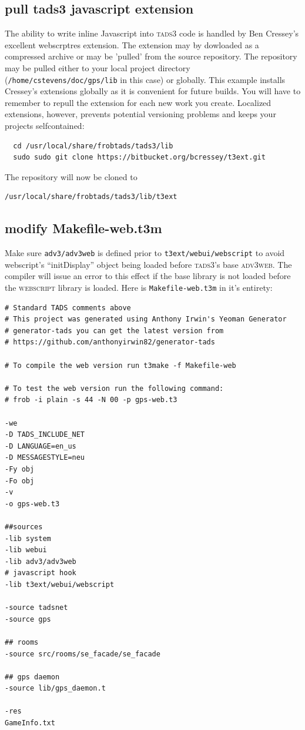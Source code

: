 \subsection{pull tads3 javascript extension}
The ability to write inline Javascript into \textsc{tads3} code is handled by
Ben Cressey's excellent webscrptres
extension. The extension may by dowloaded as a compressed
archive or may be 'pulled' from the source repository. The repository may be
pulled either to your local project directory
(\texttt{/home/cstevens/doc/gps/lib} in this case) or globally. This example
installs Cressey's extensions globally as it is convenient for future builds.
You will have to remember to re\textendash pull the extension for each new work
you create. Localized extensions, however, prevents potential versioning
problems and keeps your projects self\textendash contained:
\begin{lstlisting}
  cd /usr/local/share/frobtads/tads3/lib
  sudo sudo git clone https://bitbucket.org/bcressey/t3ext.git 
\end{lstlisting}
The repository will now be cloned to
\begin{lstlisting}
/usr/local/share/frobtads/tads3/lib/t3ext
\end{lstlisting}
\subsection{modify Makefile-web.t3m}
Make sure \texttt{\scriptsize{adv3/adv3web}} is defined prior to
\texttt{\scriptsize{t3ext/webui/webscript}} to avoid webscript's ``initDisplay''
object being loaded before \textsc{tads3}'s base \textsc{adv3web}. The compiler
will issue an error to this effect if the base library is not loaded before the
\textsc{webscript} library is loaded. Here is
\texttt{\scriptsize{Makefile-web.t3m}} in it's entirety:
\begin{lstlisting}
# Standard TADS comments above
# This project was generated using Anthony Irwin's Yeoman Generator
# generator-tads you can get the latest version from
# https://github.com/anthonyirwin82/generator-tads

# To compile the web version run t3make -f Makefile-web

# To test the web version run the following command:
# frob -i plain -s 44 -N 00 -p gps-web.t3

-we
-D TADS_INCLUDE_NET
-D LANGUAGE=en_us
-D MESSAGESTYLE=neu
-Fy obj
-Fo obj
-v
-o gps-web.t3

##sources
-lib system
-lib webui
-lib adv3/adv3web
# javascript hook
-lib t3ext/webui/webscript

-source tadsnet
-source gps

## rooms
-source src/rooms/se_facade/se_facade

## gps daemon
-source lib/gps_daemon.t

-res
GameInfo.txt
\end{lstlisting}
